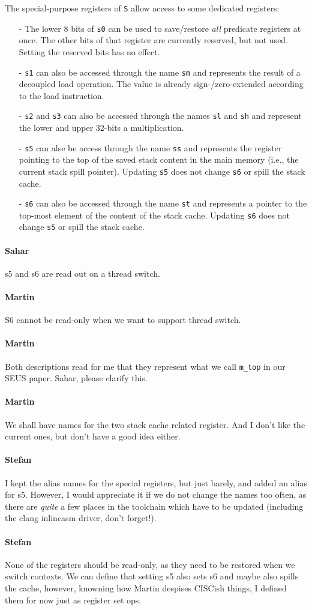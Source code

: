 \documentclass{IEEEtran}
\newcommand{\code}[1]{{\texttt{#1}}}
\newcommand{\comment}[3]{\paragraph*{\textbf{#1}}{\color{#3}#2}}
\newcommand{\martin}[1]{\comment{Martin}{#1}{Blue}}
\newcommand{\stefan}[1]{\comment{Stefan}{#1}{RoyalPurple}}
\newcommand{\sahar}[1]{\comment{Sahar}{#1}{Green}}
\begin{document}
The special-purpose registers of \texttt{S} allow access to some dedicated
registers:
\begin{itemize}
  \item [-] The lower $8$ bits of \texttt{s0} can be used to save/restore
            \emph{all} predicate registers at once. The other bits of that
            register are currently reserved, but not used. Setting the reserved 
	    bits has no effect.
  \item [-] \texttt{s1} can also be accessed through the name \texttt{sm} and
            represents the result of a decoupled load operation. The value is
            already sign-/zero-extended according to the load instruction. 
  \item [-] \texttt{s2} and \texttt{s3} can also be accessed through the names
            \texttt{sl} and \texttt{sh} and represent the lower and upper
            32-bits a multiplication. 

  \item [-] \texttt{s5} can alse be access through the name \texttt{ss} and 
            represents the register pointing to the top of the saved stack 
	    content in the main memory (i.e., the current stack spill pointer).
	    Updating \texttt{s5} does not change \texttt{s6} or spill the stack cache.

  \item [-] \texttt{s6} can also be accessed through the name \texttt{st} and
            represents a pointer to the top-most element of the content of the
            stack cache. 
	    Updating \texttt{s6} does not change \texttt{s5} or spill the stack cache.
\end{itemize}

\sahar{s5 and s6 are read out on a thread switch.}
\martin{S6 cannot be read-only when we want to support thread switch.}
\martin{Both descriptions read for me that they represent what we call \code{m\_top}
in our SEUS paper. Sahar, please clarify this.}
\martin{We shall have names for the two stack cache related register. And I don't
like the current ones, but don't have a good idea either.}
\stefan{I kept the alias names for the special registers, but just barely, and added an alias for s5.
However, I would appreciate it if we do not change the names too often, as there are \emph{quite} a few places 
in the toolchain which have to be updated (including the clang inlineasm driver, don't forget!).}
\stefan{None of the registers should be read-only, as they need to be restored when
we switch contexts. We can define that setting s5 also sets s6 and maybe also spills the cache,
however, knowning how Martin despises CISCish things, I defined them for now just as register set ops.}
\end{document}
